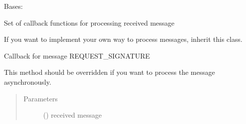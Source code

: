 \documentclass[letterpaper,10pt,english]{sphinxmanual}
\begin{document}
\begin{fulllineitems}
\label{\detokenize{bbc1.core.bbc_app:bbc1.core.bbc_app.Callback}}
Bases: 

Set of callback functions for processing received message

If you want to implement your own way to process messages, inherit this class.

\begin{fulllineitems}
\label{\detokenize{bbc1.core.bbc_app:bbc1.core.bbc_app.Callback.create_queue}}
\end{fulllineitems}


\begin{fulllineitems}
\label{\detokenize{bbc1.core.bbc_app:bbc1.core.bbc_app.Callback.dispatch}}
\end{fulllineitems}


\begin{fulllineitems}
\label{\detokenize{bbc1.core.bbc_app:bbc1.core.bbc_app.Callback.get_from_queue}}
\end{fulllineitems}


\begin{fulllineitems}
\label{\detokenize{bbc1.core.bbc_app:bbc1.core.bbc_app.Callback.proc_cmd_sign_request}}
Callback for message REQUEST\_SIGNATURE

This method should be overridden if you want to process the message asynchronously.
\begin{quote}\begin{description}
\item[{Parameters}] \leavevmode
{} () \textendash{} received message


\end{description}
\end{quote}
\end{fulllineitems}
\end{fulllineitems}
\end{document}
